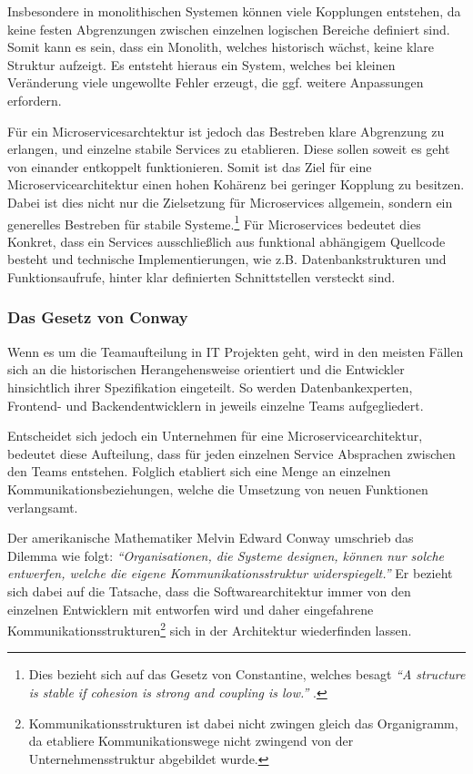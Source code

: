 Insbesondere in monolithischen Systemen können viele Kopplungen entstehen, da keine festen Abgrenzungen zwischen einzelnen logischen Bereiche definiert sind. Somit kann es sein, dass ein Monolith, welches historisch wächst, keine klare Struktur aufzeigt. Es entsteht hieraus ein System, welches bei kleinen Veränderung viele ungewollte Fehler erzeugt, die ggf. weitere Anpassungen erfordern.

Für ein Microservicesarchtektur ist jedoch das Bestreben klare Abgrenzung zu erlangen, und einzelne stabile Services zu etablieren. Diese sollen soweit es geht von einander entkoppelt funktionieren. Somit ist das Ziel für eine Microservicearchitektur einen hohen Kohärenz bei geringer Kopplung zu besitzen. Dabei ist dies nicht nur die Zielsetzung für Microservices allgemein, sondern ein generelles Bestreben für stabile Systeme.\footnote{Dies bezieht sich auf das Gesetz von Constantine, welches besagt \textit{\enquote{A structure is stable if cohesion is strong and coupling is low.}} \parencite[S. 43]{endres_handbook_2003}.} Für Microservices bedeutet dies Konkret, dass ein Services ausschließlich aus funktional abhängigem Quellcode besteht und technische Implementierungen, wie z.B. Datenbankstrukturen und Funktionsaufrufe, hinter klar definierten Schnittstellen versteckt sind.

\subsubsection{Das Gesetz von Conway}
\label{sec:conway}

Wenn es um die Teamaufteilung in IT Projekten geht, wird in den meisten Fällen sich an die historischen Herangehensweise orientiert und die Entwickler hinsichtlich ihrer Spezifikation eingeteilt. So werden Datenbankexperten, Frontend- und Backendentwicklern in jeweils einzelne Teams aufgegliedert.

Entscheidet sich jedoch ein Unternehmen für eine Microservicearchitektur, bedeutet diese Aufteilung, dass für jeden einzelnen Service Absprachen zwischen den Teams entstehen. Folglich etabliert sich eine Menge an einzelnen Kommunikationsbeziehungen, welche die  Umsetzung von neuen Funktionen verlangsamt.

Der amerikanische Mathematiker Melvin Edward Conway umschrieb das Dilemma wie folgt:
\textit{\enquote{Organisationen, die Systeme designen, können nur solche entwerfen, welche die eigene Kommunikationsstruktur widerspiegelt.}}
Er bezieht sich dabei auf die Tatsache, dass die Softwarearchitektur immer von den einzelnen Entwicklern mit entworfen wird und daher eingefahrene Kommunikationsstrukturen\footnote{Kommunikationsstrukturen ist dabei nicht zwingen gleich das Organigramm, da etabliere Kommunikationswege nicht zwingend von der Unternehmensstruktur abgebildet wurde.} sich in der Architektur wiederfinden lassen.

